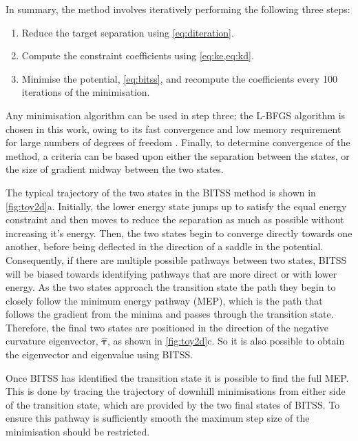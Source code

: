 \documentclass[aps,twocolumn]{revtex4-1}
\begin{document}
\topic In summary, the method involves iteratively performing the following three steps:
\begin{enumerate}
  \item Reduce the target separation using \cref{eq:diteration}.
  \item Compute the constraint coefficients using \cref{eq:ke,eq:kd}.
  \item Minimise the potential, \cref{eq:bitss}, and recompute the coefficients every 100 iterations of the minimisation.
\end{enumerate}
Any minimisation algorithm can be used in step three; the L-BFGS algorithm is chosen in this work, owing to its fast convergence and low memory requirement for large numbers of degrees of freedom \cite{Liu1989}.
Finally, to determine convergence of the method, a criteria can be based upon either the separation between the states, or the size of gradient midway between the two states.

\topic The typical trajectory of the two states in the BITSS method is shown in \cref{fig:toy2d}a.
Initially, the lower energy state jumps up to satisfy the equal energy constraint and then moves to reduce the separation as much as possible without increasing it's energy.
Then, the two states begin to converge directly towards one another, before being deflected in the direction of a saddle in the potential.
Consequently, if there are multiple possible pathways between two states, BITSS will be biased towards identifying pathways that are more direct or with lower energy.
As the two states approach the transition state the path they begin to closely follow the minimum energy pathway (MEP), which is the path that follows the gradient from the minima and passes through the transition state.
Therefore, the final two states are positioned in the direction of the negative curvature eigenvector, $\bm{\hat{\tau}}$, as shown in \cref{fig:toy2d}c.
So it is also possible to obtain the eigenvector and eigenvalue using BITSS.

\topic Once BITSS has identified the transition state it is possible to find the full MEP.
This is done by tracing the trajectory of downhill minimisations from either side of the transition state, which are provided by the two final states of BITSS.
To ensure this pathway is sufficiently smooth the maximum step size of the minimisation should be restricted.
\end{document}
